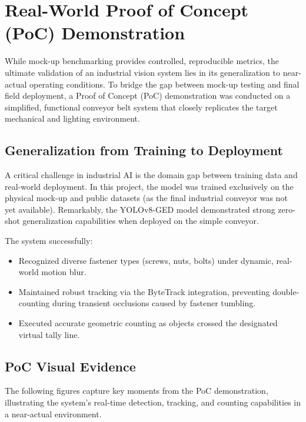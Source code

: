 \section{Real-World Proof of Concept (PoC) Demonstration}
\label{sec:poc_demo}

While mock-up benchmarking provides controlled, reproducible metrics, the ultimate validation of an industrial vision system lies in its generalization to near-actual operating conditions. To bridge the gap between mock-up testing and final field deployment, a Proof of Concept (PoC) demonstration was conducted on a simplified, functional conveyor belt system that closely replicates the target mechanical and lighting environment.

\subsection{Generalization from Training to Deployment}
A critical challenge in industrial AI is the domain gap between training data and real-world deployment. In this project, the model was trained exclusively on the physical mock-up and public datasets (as the final industrial conveyor was not yet available). Remarkably, the YOLOv8-GED model demonstrated strong zero-shot generalization capabilities when deployed on the simple conveyor.

The system successfully:
\begin{itemize}
    \item Recognized diverse fastener types (screws, nuts, bolts) under dynamic, real-world motion blur.
    \item Maintained robust tracking via the ByteTrack integration, preventing double-counting during transient occlusions caused by fastener tumbling.
    \item Executed accurate geometric counting as objects crossed the designated virtual tally line.
\end{itemize}

\subsection{PoC Visual Evidence}
The following figures capture key moments from the PoC demonstration, illustrating the system's real-time detection, tracking, and counting capabilities in a near-actual environment.


